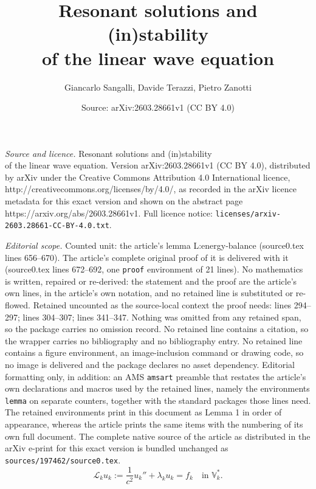 \documentclass[10pt,a4paper]{amsart}
\title{Resonant solutions and (in)stability\\ of the linear wave equation}
\author{Giancarlo Sangalli, Davide Terazzi, Pietro Zanotti}
\date{Source: arXiv:2603.28661v1 (CC BY 4.0)}
\newcommand{\data}{\mathbb{V}^*}
\begin{document}
\maketitle

\noindent\emph{Source and licence.} Resonant solutions and (in)stability\\ of the linear wave equation. Version arXiv:2603.28661v1 (CC BY 4.0), distributed by arXiv under the Creative Commons Attribution 4.0 International licence, http://creativecommons.org/licenses/by/4.0/, as recorded in the arXiv licence metadata for this exact version and shown on the abstract page https://arxiv.org/abs/2603.28661v1. Full licence notice: \texttt{licenses/arxiv-2603.28661-CC-BY-4.0.txt}.\par\smallskip

\noindent\textit{Editorial scope.} Counted unit: the article's lemma L:energy-balance (source0.tex lines 656--670). The article's complete original proof of it is delivered with it (source0.tex lines 672--692, one \texttt{proof} environment of 21 lines). No mathematics is written, repaired or re-derived: the statement and the proof are the article's own lines, in the article's own notation, and no retained line is substituted or re-flowed.  Retained uncounted as the source-local context the proof needs: lines 294--297; lines 304--307; lines 341--347.  Nothing was omitted from any retained span, so the package carries no omission record.  No retained line contains a citation, so the wrapper carries no bibliography and no bibliography entry.  No retained line contains a figure environment, an image-inclusion command or drawing code, so no image is delivered and the package declares no asset dependency.  Editorial formatting only, in addition: an AMS \texttt{amsart} preamble that restates the article's own declarations and macros used by the retained lines, namely the environments \texttt{lemma} on separate counters, together with the standard packages those lines need.  The retained environments print in this document as Lemma 1 in order of appearance, whereas the article prints the same items with the numbering of its own full document.  The complete native source of the article as distributed in the arXiv e-print for this exact version is bundled unchanged as \texttt{sources/197462/source0.tex}.
\begin{equation}
	\label{eq:model-problem-weak-reduced}
	\mathcal{L}_k u_k := \frac{1}{c^2}u_k'' +\lambda_k u_k = f_k \quad \text{in $\data_k$}.
\end{equation}
\end{document}
